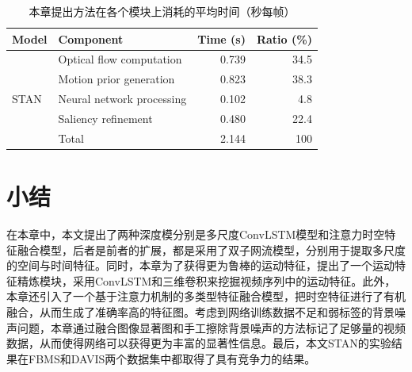 \begin{table}
\centering
\caption{本章提出方法在各个模块上消耗的平均时间（秒每帧）}
\renewcommand{\arraystretch}{1.0}
\begin{tabular}{ |l|l|r|r| }
\hline
\hline
Model & Component & Time (s) & Ratio (\%)\\ \hline
\multirow{5}{*}{STAN} & Optical flow computation & 0.739 & 34.5\\
 & Motion prior generation & 0.823 & 38.3\\
 & Neural network processing & 0.102 & 4.8\\
 & Saliency refinement & 0.480 & 22.4\\\cline{2-4}
 & Total & 2.144 & 100\\ \hline

\end{tabular}
\label{table5}
\end{table}
\section{小结}
在本章中，本文提出了两种深度模分别是多尺度ConvLSTM模型和注意力时空特征融合模型，后者是前者的扩展，都是采用了双子网流模型，分别用于提取多尺度的空间与时间特征。同时，本章为了获得更为鲁棒的运动特征，提出了一个运动特征精炼模块，采用ConvLSTM和三维卷积来挖掘视频序列中的运动特征。此外，本章还引入了一个基于注意力机制的多类型特征融合模型，把时空特征进行了有机融合，从而生成了准确率高的特征图。考虑到网络训练数据不足和弱标签的背景噪声问题，本章通过融合图像显著图和手工擦除背景噪声的方法标记了足够量的视频数据，从而使得网络可以获得更为丰富的显著性信息。最后，本文STAN的实验结果在FBMS和DAVIS两个数据集中都取得了具有竞争力的结果。